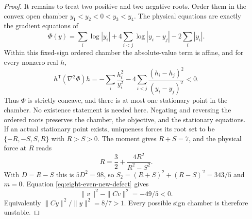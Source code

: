 \documentclass[11pt,a4paper]{article}
\theoremstyle{remark}
\begin{document}
\begin{proof}
It remains to treat two positive and two negative roots. Order them
in the convex open chamber $y_1<y_2<0<y_3<y_4$. The physical
equations are exactly the gradient equations of
\[
 \Phi(y)=\sum_i\log|y_i|+
             4\sum_{i<j}\log|y_i-y_j|-2\sum_i|y_i|.
\]
Within this fixed-sign ordered chamber the absolute-value term is
affine, and for every nonzero real $h$,
\[
 h^{\mathsf T}(\nabla^2\Phi)h
 =-\sum_i\frac{h_i^2}{y_i^2}
   -4\sum_{i<j}\frac{(h_i-h_j)^2}{(y_i-y_j)^2}<0.
\]
Thus $\Phi$ is strictly concave, and there is at most one stationary
point in the chamber. No existence statement is needed here.
Negating and reversing the ordered roots preserves the chamber,
the objective, and the stationary equations. If an actual stationary
point exists, uniqueness forces its root set to be
$\{-R,-S,S,R\}$ with $R>S>0$.
The moment gives $R+S=7$, and the physical force at $R$ reads
\[
 R=\frac32+\frac{4R^2}{R^2-S^2}.
\]
With $D=R-S$ this is $5D^2=98$, so
$S_2=(R+S)^2+(R-S)^2=343/5$ and $m=0$. Equation
\eqref{eq:eight-even-new-defect} gives
\[
 \|v\|^2-\|Cv\|^2=-49/5<0.
\]
Equivalently $\|Cy\|^2/\|y\|^2=8/7>1$.
Every possible sign chamber is therefore unstable.
\end{proof}
\end{document}
